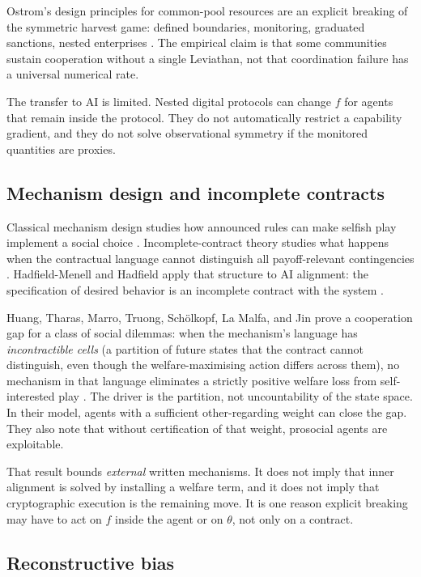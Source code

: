 \documentclass[11pt]{article}
\begin{document}
Ostrom's design principles for common-pool resources are an explicit breaking of the symmetric harvest game: defined boundaries, monitoring, graduated sanctions, nested enterprises \parencite{ostrom1990}. The empirical claim is that some communities sustain cooperation without a single Leviathan, not that coordination failure has a universal numerical rate.

The transfer to AI is limited. Nested digital protocols can change \(f\) for agents that remain inside the protocol. They do not automatically restrict a capability gradient, and they do not solve observational symmetry if the monitored quantities are proxies.

\subsection{Mechanism design and incomplete contracts}

Classical mechanism design studies how announced rules can make selfish play implement a social choice \parencite{maskin1999}. 
Incomplete-contract theory studies what happens when the contractual language cannot distinguish all payoff-relevant contingencies \parencite{grossman1986,hart1988,hart1999}. 
Hadfield-Menell and Hadfield apply that structure to AI alignment: the specification of desired behavior is an incomplete contract with the system \parencite{hadfield2019}.

Huang, Tharas, Marro, Truong, Sch\"olkopf, La Malfa, and Jin prove a cooperation gap for a class of social dilemmas: when the mechanism's language has \emph{incontractible cells} (a partition of future states that the contract cannot distinguish, even though the welfare-maximising action differs across them), no mechanism in that language eliminates a strictly positive welfare loss from self-interested play \parencite{huang2026}. The driver is the partition, not uncountability of the state space. In their model, agents with a sufficient other-regarding weight can close the gap. They also note that without certification of that weight, prosocial agents are exploitable.

That result bounds \emph{external} written mechanisms. It does not imply that inner alignment is solved by installing a welfare term, and it does not imply that cryptographic execution is the remaining move. It is one reason explicit breaking may have to act on \(f\) inside the agent or on \(\theta\), not only on a contract.

\subsection{Reconstructive bias}
\end{document}
